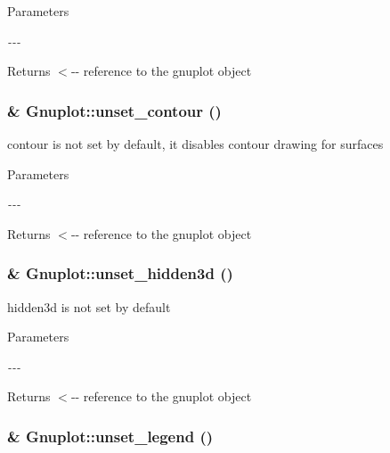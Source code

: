 \begin{DoxyParams}{Parameters}
\item[{\em -\/-\/-\/}]\end{DoxyParams}
\begin{DoxyReturn}{Returns}
$<$-\/-\/ reference to the gnuplot object 
\end{DoxyReturn}
\hypertarget{class_gnuplot_a0b8522cb81e46dd4f5a22b7b48f977b1}{
\subsubsection[{unset\_\-contour}]{\& Gnuplot::unset\_\-contour ()}}
\label{class_gnuplot_a0b8522cb81e46dd4f5a22b7b48f977b1}
contour is not set by default, it disables contour drawing for surfaces


\begin{DoxyParams}{Parameters}
\item[{\em -\/-\/-\/}]\end{DoxyParams}
\begin{DoxyReturn}{Returns}
$<$-\/-\/ reference to the gnuplot object 
\end{DoxyReturn}
\hypertarget{class_gnuplot_ab8688182047f746090e1e5f2a8c11c9e}{
\subsubsection[{unset\_\-hidden3d}]{\& Gnuplot::unset\_\-hidden3d ()}}
\label{class_gnuplot_ab8688182047f746090e1e5f2a8c11c9e}
hidden3d is not set by default


\begin{DoxyParams}{Parameters}
\item[{\em -\/-\/-\/}]\end{DoxyParams}
\begin{DoxyReturn}{Returns}
$<$-\/-\/ reference to the gnuplot object 
\end{DoxyReturn}
\hypertarget{class_gnuplot_ace901a18ab1a459213afd3ee0233b5ce}{
\subsubsection[{unset\_\-legend}]{\& Gnuplot::unset\_\-legend ()}}
\label{class_gnuplot_ace901a18ab1a459213afd3ee0233b5ce}


